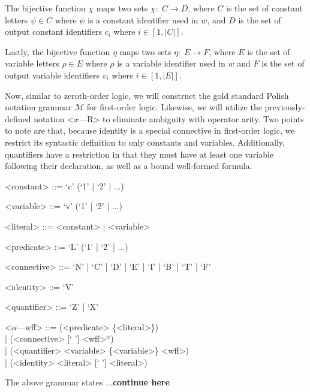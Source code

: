 \documentclass[ms]{uncgdissertationexp2}
\theoremstyle{plain}
\theoremstyle{definition}
\theoremstyle{remark}
\begin{document}
The bijective function $\chi$ maps two sets $\chi:\;C \to D$, where $C$ is the set of constant letters $\psi \in C$ where $\psi$ is a constant identifier used in $w$, and $D$ is the set of output constant identifiers $c_{i}$ where $i \in [1, |C|]$.

Lastly, the bijective function $\eta$ maps two sets $\eta:\;E \to F$, where $E$ is the set of variable letters $\rho \in E$ where $\rho$ is a variable identifier used in $w$ and $F$ is the set of output variable identifiers $v_{i}$ where $i \in [1, |E|]$.

Now, similar to zeroth-order logic, we will construct the gold standard Polish notation grammar $\mathcal{M}$ for first-order logic. Likewise, we will utilize the previously-defined notation \textless{$x$---R\textgreater} to eliminate ambiguity with operator arity. Two points to note are that, because identity is a special connective in first-order logic, we restrict its syntactic definition to only constants and variables. Additionally, quantifiers have a restriction in that they must have at least one variable following their declaration, as well as a bound well-formed formula.
\begin{grammar}
	<constant> ::= `c' (`1' | `2' | ...)
	
	<variable> ::= `v' (`1' | `2' | ...)
	
	<literal> ::= <constant> | <variable>
	
	<predicate> ::= `L' (`1' | `2' | ...)
	
	<connective> ::= `N' | `C' | `D' | `E' | `I' | `B' | `T' | `F'
	
	<identity> ::= `V'
	
	<quantifier> ::= `Z' | `X'
	
	<$\alpha$---wff> ::= (<predicate> \{<literal>\}) \\| (<connective> [` '] <wff>$^{\alpha}$) \\| (<quantifier> <variable> \{<variable>\} <wff>)\\| (<identity> <literal> [` '] <literal>)
\end{grammar}
The above grammar states ...\textbf{continue here}
\end{document}
